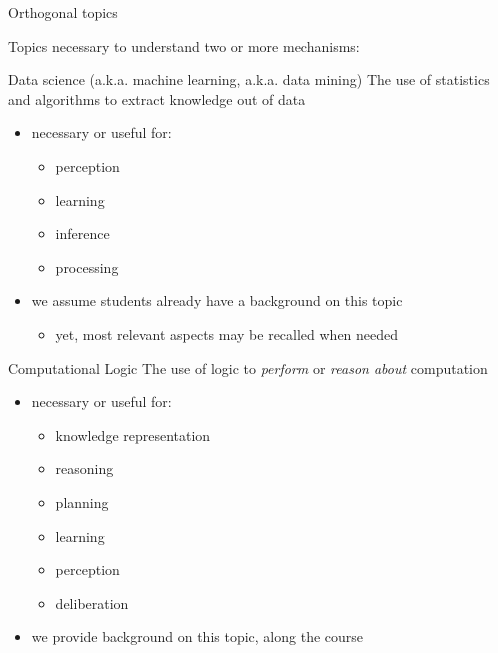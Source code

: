 \documentclass[presentation]{beamer}\mode<presentation>{\usetheme{AMSBolognaFC}}
\begin{document}
\begin{frame}[c,allowframebreaks]{Orthogonal topics}

Topics necessary to understand two or more mechanisms:

\begin{block}{Data science (a.k.a. machine learning, a.k.a. data mining)}
    The use of statistics and algorithms to extract knowledge out of data
    \begin{itemize}
        \item necessary or useful for:
        \vspace{-10pt}
        \begin{multicols}{2}
            \begin{itemize}
                \item perception
                \item learning
                \item inference
                \item processing
            \end{itemize}
        \end{multicols}
    \end{itemize}
\end{block}
%
\begin{itemize}
    \item we assume students already have a background on this topic
    \begin{itemize}
        \item yet, most relevant aspects may be recalled when needed
    \end{itemize}
\end{itemize}

\begin{block}{Computational Logic}
    The use of logic to \emph{perform} or \emph{reason about} computation
    \begin{itemize}
        \item necessary or useful for:
        \vspace{-10pt}
        \begin{multicols}{2}
            \begin{itemize}
                \item knowledge representation
                \item reasoning
                \item planning
                \item learning
                \item perception
                \item deliberation
            \end{itemize}
        \end{multicols}
    \end{itemize}
\end{block}
%
\begin{itemize}
    \item we provide background on this topic, along the course
\end{itemize}

\end{frame}
\end{document}
